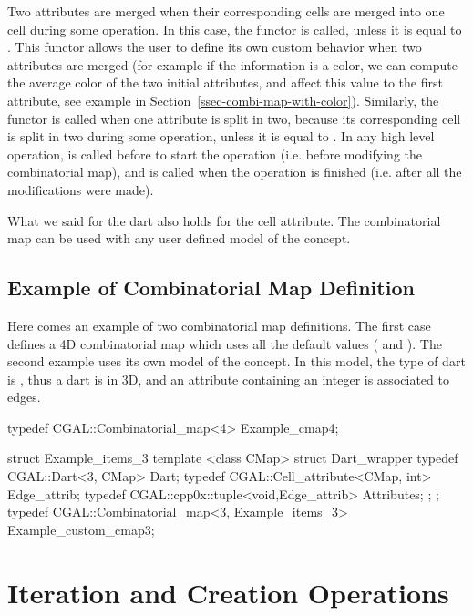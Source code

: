 Two attributes are merged when their corresponding cells are merged
into one cell during some operation. In this case, the functor
 is called, unless it is equal to .
This functor allows the user to define its own custom behavior when
two attributes are merged (for example if the information is a color,
we can compute the average color of the two initial attributes, and
affect this value to the first attribute, see example in
Section~\ref{ssec-combi-map-with-color}).  Similarly, the functor
 is called when one attribute is split in two, because
its corresponding cell is split in two during some operation, unless
it is equal to .  In any high level operation,
 is called before to start the operation (i.e. before
modifying the combinatorial map), and  is called when the
operation is finished (i.e. after all the modifications were made).

What we said for the dart also holds for the cell attribute.  The
combinatorial map can be used with any user defined model of the 
 concept.

\subsection{Example of Combinatorial Map Definition}\label{ssec-example-def}

Here comes an example of two combinatorial map definitions.  The first
case  defines a 4D combinatorial map which uses all
the default values ( and
). The second example
 uses its own model of the
 concept. In this model, the type
of dart is , thus a dart is in 3D, and an
attribute containing an integer is associated to edges.

\begin{ccExampleCode}
typedef CGAL::Combinatorial_map<4> Example_cmap4;

struct Example_items_3
{
   template <class CMap>
   struct Dart_wrapper
   {
     typedef CGAL::Dart<3, CMap> Dart;
     typedef CGAL::Cell_attribute<CMap, int> Edge_attrib;
     typedef CGAL::cpp0x::tuple<void,Edge_attrib> Attributes;
   };
};
typedef CGAL::Combinatorial_map<3, Example_items_3> Example_custom_cmap3;
\end{ccExampleCode}


\section{Iteration and Creation Operations}

